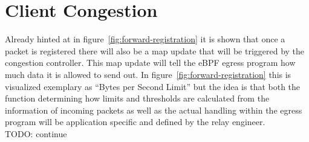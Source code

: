 \section{Client Congestion}\label{sec:client_congestion}

Already hinted at in figure~\ref{fig:forward-registration} it is shown that once a packet is 
registered there will also be a map update that will be triggered by the congestion controller.
This map update will tell the eBPF egress program how much data it is allowed to send out. 
In figure~\ref{fig:forward-registration} this is visualized exemplary as ``Bytes per Second Limit''
but the idea is that both the function determining how limits and thresholds are calculated from 
the information of incoming packets as well as the actual handling within the egress program 
will be application specific and defined by the relay engineer.
\\
TODO: continue